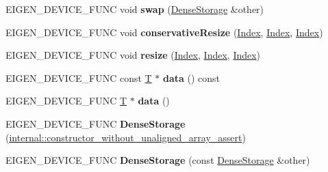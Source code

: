 \begin{DoxyCompactItemize}
E\+I\+G\+E\+N\+\_\+\+D\+E\+V\+I\+C\+E\+\_\+\+F\+U\+NC void {\bfseries swap} (\hyperlink{class_eigen_1_1_dense_storage}{Dense\+Storage} \&other)
\item 
\mbox{\label{class_eigen_1_1_dense_storage_aaca3c8de8c76bfc7f7c4856c0faae7b3}} 
E\+I\+G\+E\+N\+\_\+\+D\+E\+V\+I\+C\+E\+\_\+\+F\+U\+NC void {\bfseries conservative\+Resize} (\hyperlink{namespace_eigen_a62e77e0933482dafde8fe197d9a2cfde}{Index}, \hyperlink{namespace_eigen_a62e77e0933482dafde8fe197d9a2cfde}{Index}, \hyperlink{namespace_eigen_a62e77e0933482dafde8fe197d9a2cfde}{Index})
\item 
\mbox{\label{class_eigen_1_1_dense_storage_a22518a835225a3464a2b12396f13a12c}} 
E\+I\+G\+E\+N\+\_\+\+D\+E\+V\+I\+C\+E\+\_\+\+F\+U\+NC void {\bfseries resize} (\hyperlink{namespace_eigen_a62e77e0933482dafde8fe197d9a2cfde}{Index}, \hyperlink{namespace_eigen_a62e77e0933482dafde8fe197d9a2cfde}{Index}, \hyperlink{namespace_eigen_a62e77e0933482dafde8fe197d9a2cfde}{Index})
\item 
\mbox{\label{class_eigen_1_1_dense_storage_a5b5984857e0f9091125bc75acc6f770f}} 
E\+I\+G\+E\+N\+\_\+\+D\+E\+V\+I\+C\+E\+\_\+\+F\+U\+NC const \hyperlink{group___sparse_core___module}{T} $\ast$ {\bfseries data} () const
\item 
\mbox{\label{class_eigen_1_1_dense_storage_a640d283f082751670f766a6f4ace1867}} 
E\+I\+G\+E\+N\+\_\+\+D\+E\+V\+I\+C\+E\+\_\+\+F\+U\+NC \hyperlink{group___sparse_core___module}{T} $\ast$ {\bfseries data} ()
\item 
\mbox{\label{class_eigen_1_1_dense_storage_a3ef428e5df9526e6a207ced6e8679e54}} 
E\+I\+G\+E\+N\+\_\+\+D\+E\+V\+I\+C\+E\+\_\+\+F\+U\+NC {\bfseries Dense\+Storage} (\hyperlink{struct_eigen_1_1internal_1_1constructor__without__unaligned__array__assert}{internal\+::constructor\+\_\+without\+\_\+unaligned\+\_\+array\+\_\+assert})
\item 
\mbox{\label{class_eigen_1_1_dense_storage_adfc3fa9ef776cb8406879c8f1a0c508d}} 
E\+I\+G\+E\+N\+\_\+\+D\+E\+V\+I\+C\+E\+\_\+\+F\+U\+NC {\bfseries Dense\+Storage} (const \hyperlink{class_eigen_1_1_dense_storage}{Dense\+Storage} \&other)

\end{DoxyCompactItemize}
